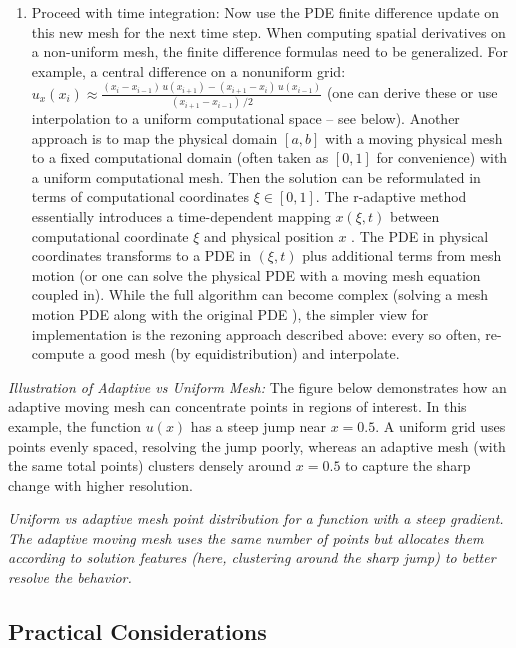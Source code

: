 \documentclass{adonis}
\begin{document}
\begin{enumerate}
    \item Proceed with time integration: Now use the PDE finite difference update on this new mesh for the next time step. When computing spatial derivatives on a non-uniform mesh, the finite difference formulas need to be generalized. For example, a central difference on a nonuniform grid: $u_x(x_i)\approx \frac{(x_i - x_{i-1})\,u(x_{i+1}) - (x_{i+1}-x_{i})\,u(x_{i-1})}{(x_{i+1}-x_{i-1})\,/2}$ (one can derive these or use interpolation to a uniform computational space – see below). Another approach is to map the physical domain $[a,b]$ with a moving physical mesh to a fixed computational domain (often taken as $[0,1]$ for convenience) with a uniform computational mesh. Then the solution can be reformulated in terms of computational coordinates $\xi\in[0,1]$. The r-adaptive method essentially introduces a time-dependent mapping $x(\xi,t)$ between computational coordinate $\xi$ and physical position $x$ . The PDE in physical coordinates transforms to a PDE in $(\xi,t)$ plus additional terms from mesh motion (or one can solve the physical PDE with a moving mesh equation coupled in). While the full algorithm can become complex (solving a mesh motion PDE along with the original PDE ), the simpler view for implementation is the rezoning approach described above: every so often, re-compute a good mesh (by equidistribution) and interpolate.
\end{enumerate}

\textit{Illustration of Adaptive vs Uniform Mesh:} The figure below demonstrates how an adaptive moving mesh can concentrate points in regions of interest. In this example, the function $u(x)$ has a steep jump near $x=0.5$. A uniform grid uses points evenly spaced, resolving the jump poorly, whereas an adaptive mesh (with the same total points) clusters densely around $x=0.5$ to capture the sharp change with higher resolution.

\textit{Uniform vs adaptive mesh point distribution for a function with a steep gradient. The adaptive moving mesh uses the same number of points but allocates them according to solution features (here, clustering around the sharp jump) to better resolve the behavior.}

\subsection{Practical Considerations}
\end{document}
